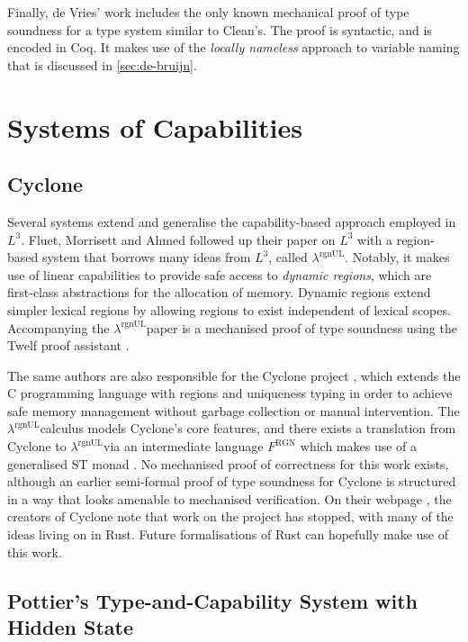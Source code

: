 \documentclass[]{unswthesis}
\newcommand{\rgnUL}{$\lambda^\text{rgnUL}$\text{ }}
\let\i\textit
\begin{document}
Finally, de Vries' work includes the only known mechanical proof of type soundness for a type system similar to Clean's. The proof is syntactic, and is encoded in Coq. It makes use of the \i{locally nameless} approach to variable naming that is discussed in \cref{sec:de-bruijn}.

\section{Systems of Capabilities}

\subsection{Cyclone}

Several systems extend and generalise the capability-based approach employed in $L^3$. Fluet, Morrisett and Ahmed followed up their paper on $L^3$ with a region-based system that borrows many ideas from $L^3$, called \rgnUL \cite{fluet06}. Notably, it makes use of linear capabilities to provide safe access to \i{dynamic regions}, which are first-class abstractions for the allocation of memory. Dynamic regions extend simpler lexical regions by allowing regions to exist independent of lexical scopes. Accompanying the \rgnUL paper is a mechanised proof of type soundness using the Twelf proof assistant \cite{pfenning99}.

The same authors are also responsible for the Cyclone project \cite{grossman05}, which extends the C programming language with regions and uniqueness typing in order to achieve safe memory management without garbage collection or manual intervention. The \rgnUL calculus models Cyclone's core features, and there exists a translation from Cyclone to \rgnUL via an intermediate language $F^\text{RGN}$ which makes use of a generalised ST monad \cite{fluet06, fluet04}. No mechanised proof of correctness for this work exists, although an earlier semi-formal proof of type soundness for Cyclone \cite{jim01} is structured in a way that looks amenable to mechanised verification. On their webpage \cite{cycloneWeb}, the creators of Cyclone note that work on the project has stopped, with many of the ideas living on in Rust. Future formalisations of Rust can hopefully make use of this work.

\subsection{Pottier's Type-and-Capability System with Hidden State}
\label{sec:ssphs}
\end{document}
